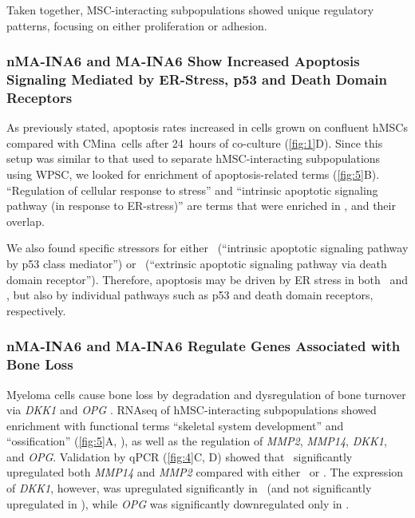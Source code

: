 Taken together, MSC-interacting subpopulations showed unique regulatory
patterns, focusing on either proliferation or adhesion.


\subsubsection*{nMA-INA6 and MA-INA6 Show Increased Apoptosis Signaling Mediated
    by ER-Stress, p53 and Death Domain Receptors}%
\label{C1:results:RNAseq:apoptosis}%
As previously stated, apoptosis rates increased in \INA cells grown on confluent
hMSCs compared with \ac{CMina}\ cells after \SI{24}{hours} of co-culture
(\autoref{fig:1}D). Since this setup was similar to that used to separate
hMSC-interacting subpopulations using WPSC, we looked for enrichment of
apoptosis-related terms (\autoref{fig:5}B). “Regulation of cellular response to
stress” and “intrinsic apoptotic signaling pathway (in response to ER-stress)”
are terms that were enriched in ,  and their
overlap.




We also found specific stressors for either \nMAina\ (“intrinsic
apoptotic signaling pathway by p53 class mediator”) or \MAina\ (“extrinsic
apoptotic signaling pathway via death domain receptor”). Therefore, apoptosis
may be driven by ER stress in both \nMAina\ and \MAina, but also by individual
pathways such as p53 and death domain receptors, respectively.


\subsubsection*{nMA-INA6 and MA-INA6 Regulate Genes Associated with Bone Loss}%
\label{C1:results:RNAseq:bone_loss}%
Myeloma cells cause bone loss by degradation and dysregulation of bone turnover
via \textit{DKK1} and \textit{OPG}
\cite{standalOsteoprotegerinBoundInternalized2002,vanvalckenborghMultifunctionalRoleMatrix2004,zhouDickkopf1KeyRegulator2013}.
RNAseq of hMSC-interacting subpopulations showed enrichment with functional
terms ``skeletal system development'' and ``ossification'' (\autoref{fig:5}A,
), as well as the regulation of
\textit{MMP2}, \textit{MMP14}, \textit{DKK1}, and \textit{OPG}. Validation by
qPCR (\autoref{fig:4}C, D) showed that \MAina\ significantly upregulated both
\textit{MMP14} and \textit{MMP2} compared with either \nMAina\ or \CMina. The
expression of \textit{DKK1}, however, was upregulated significantly in \nMAina\
(and not significantly upregulated in \MAina), while \textit{OPG} was
significantly downregulated only in \nMAina.

